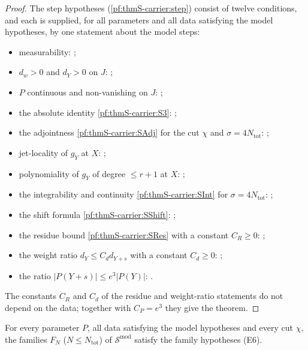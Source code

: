 \begin{proof}
The step hypotheses (\cref{pf:thmS-carrier:step}) consist of twelve conditions, and each is supplied, for all parameters and
all data satisfying the model hypotheses, by one statement about the model steps:
\begin{itemize}
\item measurability: ;
\item $d_w>0$ and $d_Y>0$ on $J$: ;
\item $P$ continuous and non-vanishing on $J$: ;
\item the absolute identity \ref{pf:thmS-carrier:S3}: ;
\item the adjointness \ref{pf:thmS-carrier:SAdj} for the cut $\chi$ and $\sigma=4N_{\mathrm{tot}}$:
  ;
\item jet-locality of $g_Y$ at $X$: ;
\item polynomiality of $g_Y$ of degree $\le r+1$ at $X$: ;
\item the integrability and continuity \ref{pf:thmS-carrier:SInt} for $\sigma=4N_{\mathrm{tot}}$:
  ;
\item the shift formula \ref{pf:thmS-carrier:SShift}: ;
\item the residue bound \ref{pf:thmS-carrier:SRes} with a constant $C_R\ge0$: ;
\item the weight ratio $d_Y\le C_dd_{Y+s}$ with a constant $C_d\ge0$: ;
\item the ratio $|P(Y+s)|\le e^3|P(Y)|$: .
\end{itemize}
The constants $C_R$ and $C_d$ of the residue and weight-ratio statements do not depend on the data; together with $C_P=e^3$
they give the theorem.
\end{proof}

\begin{theorem}\label{pf:thmS-carrier:famimports}
For every parameter $P$, all data satisfying the model hypotheses and every cut $\chi$, the families $F_N$
($N\le N_{\mathrm{tot}}$) of $\mathcal S^{\mathrm{mod}}$ satisfy the family hypotheses (E6).
\end{theorem}

